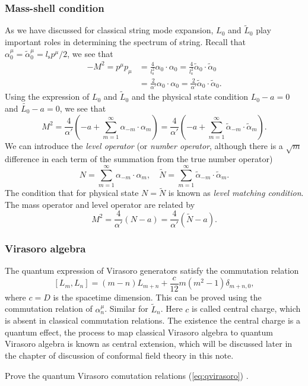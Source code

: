 \documentclass[graybox,envcountchap,sectrefs]{svmono}
\begin{document}
\subsubsection*{Mass-shell condition}
As we have discussed for classical string mode expansion, $L_0$ and $\tilde{L}_0$ play important roles in determining the spectrum of string. Recall that $\alpha_{0}^{\mu}=\tilde{\alpha}_0^{\mu}=l_{\mathrm{s}}p^{\mu}/2$, we see that
\begin{align}
-M^2=p^{\mu}p_{\mu}&=\frac{4}{l_{\mathrm{s}}^2}	\alpha_{0}\cdot \alpha_0=\frac{4}{l_{\mathrm{s}}^2}	\tilde{\alpha}_{0}\cdot \tilde{\alpha}_0\nonumber\\
&=\frac{2}{\alpha'}	\alpha_{0}\cdot \alpha_0=\frac{2}{\alpha'}	\tilde{\alpha}_{0}\cdot \tilde{\alpha}_0.
\end{align}
Using the expression of $L_0$ and $\tilde{L}_0$ and the physical state condition $L_0-a=0$ and $\tilde{L_0}-a=0$, we see that
\begin{equation}
M^2=\frac{4}{\alpha'}(-a+\sum_{m=1}^{\infty}\alpha_{-m}\cdot\alpha_{m})=\frac{4}{\alpha'}(-a+\sum_{m=1}^{\infty}\tilde{\alpha}_{-m}\cdot\tilde{\alpha}_{m})	.
\end{equation}	
We can introduce the \emph{level operator} (or \emph{number operator}, although there is a $\sqrt{m}$ difference in each term of the summation from the true number operator)
\begin{equation}
N=\sum_{m=1}^{\infty}\alpha_{-m}\cdot\alpha_{m},\quad \tilde{N}=	\sum_{m=1}^{\infty}\tilde{\alpha}_{-m}\cdot\tilde{\alpha}_{m}.
\end{equation}
The condition that for physical state $N=\tilde{N}$ is known as \emph{level matching condition}. The mass operator and level operator are related by
\begin{equation}
M^2=\frac{4}{\alpha'}(N-a)=\frac{4}{\alpha'}(\tilde{N}-a).	
\end{equation}






\subsubsection*{Virasoro algebra}



The quantum expression of Virasoro generators satisfy the commutation relation
\begin{equation}\label{eq:qvirasoro}
[L_m,L_n]=(m-n)L_{m+n}+\frac{c}{12}m(m^2-1)\delta_{m+n,0},	
\end{equation}
where $c=D$ is the spacetime dimension. This can be proved using the commutation relation of $\alpha_n^{\mu}$. Similar for $\tilde{L}_n$.
Here $c$ is called central charge, which is absent in classical commutation relations. The existence the central charge is a quantum effect, the process to map classical Virasoro algebra to quantum Virasoro algebra is known as central extension, which will be discussed later in the chapter of discussion of conformal field theory in this note.
\begin{exercise}
Prove the quantum Virasoro comutation relations (\ref{eq:qvirasoro})	.
\end{exercise}
\end{document}
